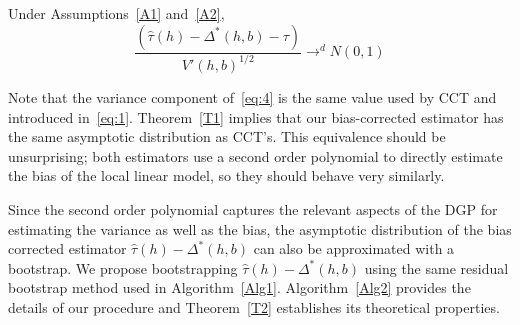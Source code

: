 \documentclass[12pt,fleqn]{article}
\begin{document}
\begin{theorem}\label{T1}
  Under Assumptions~\ref{A1} and~\ref{A2},
\begin{equation}
  \label{eq:4}
  \frac{(\hat\tau(h) - \Delta^{*}(h,b) - \tau)}{ V'(h, b)^{1/2}}
  \to^{d} N(0,1)
\end{equation}
\end{theorem}

Note that the variance component of~\eqref{eq:4} is the same value used by CCT
and introduced in~\eqref{eq:1}. Theorem~\ref{T1} implies that our bias-corrected
estimator has the same asymptotic distribution as CCT's. This equivalence should
be unsurprising; both estimators use a second order polynomial to directly estimate
the bias of the local linear model, so they should behave very similarly.

Since the second order polynomial captures the relevant aspects of the DGP for
estimating the variance as well as the bias, the asymptotic distribution of the
bias corrected estimator $\hat\tau(h) - \Delta^*(h,b)$ can also be approximated
with a bootstrap. We propose bootstrapping $\hat\tau(h) - \Delta^*(h,b)$ using
the same residual bootstrap method used in
Algorithm~\ref{Alg1}. Algorithm~\ref{Alg2} provides the details of our procedure
and Theorem~\ref{T2} establishes its theoretical properties.
\end{document}
